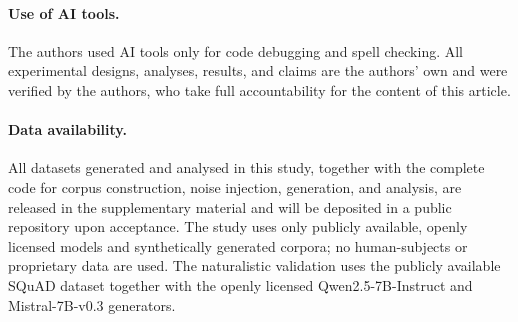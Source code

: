 \documentclass[11pt]{article}
\begin{document}
\paragraph{Use of AI tools.} The authors used AI tools only for code
debugging and spell checking. All experimental designs, analyses, results,
and claims are the authors' own and were verified by the authors, who take
full accountability for the content of this article.

\paragraph{Data availability.} All datasets generated and analysed in this
study, together with the complete code for corpus construction, noise
injection, generation, and analysis, are released in the supplementary
material and will be deposited in a public repository upon acceptance. The
study uses only publicly available, openly licensed models and synthetically
generated corpora; no human-subjects or proprietary data are used. The
naturalistic validation uses the publicly available SQuAD dataset together
with the openly licensed Qwen2.5-7B-Instruct and Mistral-7B-v0.3 generators.


\end{document}
